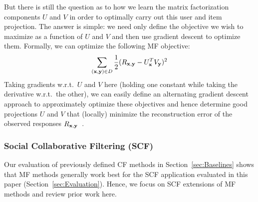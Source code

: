 But there is still the question as to how we learn the matrix
factorization components $U$ and $V$ in order to optimally carry out this
user and item projection.  The answer is simple: we need only
define the objective we wish to maximize as a function of $U$ and
$V$ and then use gradient descent to optimize them.  Formally,
we can optimize the following MF objective: %
\begin{align}
\sum_{(\mathbf{x},\mathbf{y}) \in D} \frac{1}{2} (R_{\mathbf{x},\mathbf{y}} - U_{\mathbf{x}}^T V_{\mathbf{y}})^2
\end{align}
Taking gradients w.r.t.\ $U$ and $V$ here (holding one constant while
taking the derivative w.r.t.\ the other), we can easily define an
alternating gradient descent approach to approximately
optimize these objectives and hence determine good projections $U$
and $V$ that (locally) minimize the reconstruction error of the observed
responses $R_{\mathbf{x},\mathbf{y}}$~\cite{pmf}.


\subsubsection{Social Collaborative Filtering (SCF)}
\label{sec:scf_original}

Our evaluation of previously defined CF methods in
Section~\ref{sec:Baselines} shows that MF methods generally work best
for the SCF application evaluated in this paper
(Section~\ref{sec:Evaluation}).  Hence, we focus on SCF extensions of
MF methods and review prior work here.

